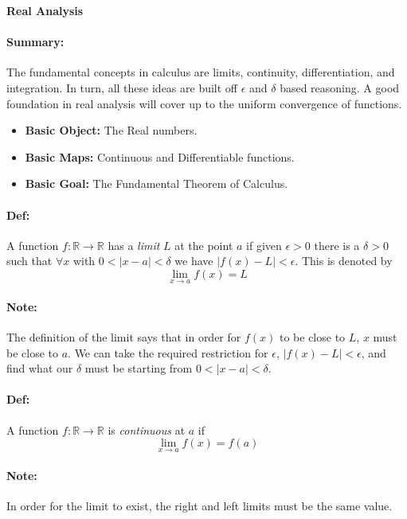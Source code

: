 \documentclass[10pt,a4paper]{article}
\begin{document}
\begin{center}
\textbf{Real Analysis}
\end{center}

\paragraph{Summary:} The fundamental concepts in calculus are limits, continuity, differentiation, and integration. In turn, all these ideas are built off $\epsilon$ and $\delta$ based reasoning. A good foundation in real analysis will cover up to the uniform convergence of functions.
\begin{itemize}
\item \textbf{Basic Object:} The Real numbers.
\item \textbf{Basic Maps:} Continuous and Differentiable functions.
\item \textbf{Basic Goal:} The Fundamental Theorem of Calculus.
\end{itemize}

\paragraph{Def:} A function $f: \mathbb{R} \to \mathbb{R}$ has a \textit{limit} $L$ at the point $a$ if given $\epsilon >0$ there is a $\delta > 0$ such that $\forall x$ with $0 < |x-a| < \delta$ we have $|f(x)-L| < \epsilon$. This is denoted by 
$$ \lim_{x \to a}f(x) = L$$

\paragraph{Note:} The definition of the limit says that in order for $f(x)$ to be close to $L$, $x$ must be close to $a$. We can take the required restriction for $\epsilon$, $|f(x)-L| < \epsilon$, and find what our $\delta$ must be starting from $0 < |x-a| < \delta$.

\paragraph{Def:} A function $f: \mathbb{R} \to \mathbb{R}$ is \textit{continuous} at $a$ if 
$$ \lim_{x \to a} f(x) = f(a)$$

\paragraph{Note:} In order for the limit to exist, the right and left limits must be the same value.
\end{document}
